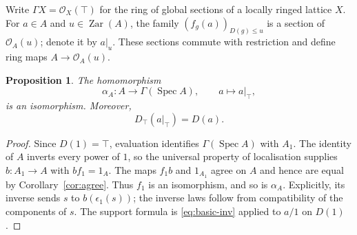 \documentclass[11pt]{amsart}
\newtheorem{proposition}[theorem]{Proposition}
\theoremstyle{definition}
\theoremstyle{remark}
\newcommand{\Zar}{\operatorname{Zar}}
\newcommand{\Spec}{\operatorname{Spec}}
\newcommand{\OO}{\mathcal O}
\begin{document}
Write $\Gamma X=\OO_X(\top)$ for the ring of global sections of a locally
ringed lattice $X$. For $a\in A$ and $u\in\Zar(A)$, the family
$(f_g(a))_{D(g)\leq u}$ is a section of $\OO_A(u)$; denote it by $a|_u$.
These sections commute with restriction and define ring maps
$A\to\OO_A(u)$.

\begin{proposition}\label{prop:global}
The homomorphism
\[
 \alpha_A:A\longrightarrow\Gamma(\Spec A),\qquad a\longmapsto a|_\top,
\]
is an isomorphism. Moreover,
\[
 D_\top(a|_\top)=D(a).
\]
\end{proposition}
\begin{proof}
Since $D(1)=\top$, evaluation identifies $\Gamma(\Spec A)$ with $A_1$.
The identity of $A$ inverts every power of $1$, so the universal property
of localisation supplies $b:A_1\to A$ with $bf_1=1_A$.
The maps $f_1b$ and $1_{A_1}$ agree on $A$ and hence are equal by
Corollary~\ref{cor:agree}. Thus $f_1$ is an isomorphism, and so is
$\alpha_A$. Explicitly, its inverse sends $s$ to $b(\epsilon_1(s))$;
the inverse laws follow from compatibility of the components of $s$.
The support formula is \eqref{eq:basic-inv} applied to $a/1$ on $D(1)$.
\end{proof}
\end{document}

